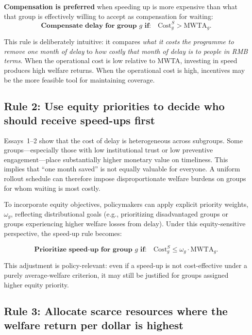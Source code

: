 \documentclass[doublespacing]{utdthesis}
\begin{document}
\textbf{Compensation is preferred} when speeding up is more expensive than what that group is effectively willing to accept as compensation for waiting:
\begin{equation}
\textbf{Compensate delay for group $g$ if:}\quad \text{Cost}^{S}_g > \text{MWTA}_g.
\label{eq:policy_rule_comp}
\end{equation}

This rule is deliberately intuitive: it compares \emph{what it costs the programme to remove one month of delay} to \emph{how costly that month of delay is to people in RMB terms}. When the operational cost is low relative to MWTA, investing in speed produces high welfare returns. When the operational cost is high, incentives may be the more feasible tool for maintaining coverage.

\subsection{Rule 2: Use equity priorities to decide who should receive speed-ups first}
\label{subsec:essay3_rule2}

Essays~1--2 show that the cost of delay is heterogeneous across subgroups. Some groups—especially those with low institutional trust or low preventive engagement—place substantially higher monetary value on timeliness. This implies that ``one month saved'' is not equally valuable for everyone. A uniform rollout schedule can therefore impose disproportionate welfare burdens on groups for whom waiting is most costly.

To incorporate equity objectives, policymakers can apply explicit priority weights, $\omega_g$, reflecting distributional goals (e.g., prioritizing disadvantaged groups or groups experiencing higher welfare losses from delay). Under this equity-sensitive perspective, the speed-up rule becomes:

\begin{equation}
\textbf{Prioritize speed-up for group $g$ if:}\quad \text{Cost}^{S}_g \le \omega_g \cdot \text{MWTA}_g.
\label{eq:policy_rule_equity}
\end{equation}

This adjustment is policy-relevant: even if a speed-up is not cost-effective under a purely average-welfare criterion, it may still be justified for groups assigned higher equity priority.

\subsection{Rule 3: Allocate scarce resources where the welfare return per dollar is highest}
\label{subsec:essay3_budget}
\end{document}
